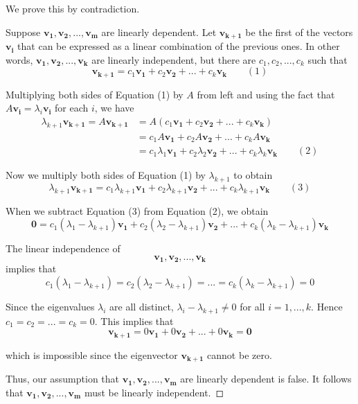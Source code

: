\documentclass[
  a4paper,
  DIV=11,
  numbers=noendperiod,
  oneside]{scrreprt}
\theoremstyle{definition}
\theoremstyle{remark}
\newenvironment{fbx}[3]{\begin{tcolorbox}[enhanced, breakable,%
attach boxed title to top*={xshift=1.4pt},
boxed title style={boxrule=0.0mm, fuzzy shadow={1pt}{-1pt}{0mm}{0.1mm}{gray}, arc=.3em, rounded corners=east, sharp corners=west}, colframe=#1-color2, colbacktitle=#1-color1, colback = white, coltitle=black,  titlerule=0mm, toprule=0pt, bottomrule=.7pt, leftrule=.3em, rightrule=0pt, outer arc=.3em,  arc=0pt,	 sharp corners = east, left=.5em, bottomtitle=1mm, toptitle=1mm,title=\textbf{#2}\hspace{0.5em}{#3}]}
{\end{tcolorbox}}
\begin{document}
\label{Proofux2a-5.5}
\begin{fbx}{Proof}{Proof}{}
\label{Proof*-5.5}
We prove this by contradiction.

Suppose \(\mathbf{v_{1}}, \mathbf{v_{2}}, ..., \mathbf{v_{m}}\) are
linearly dependent. Let \(\mathbf{v_{k+1}}\) be the first of the vectors
\(\mathbf{v_{i}}\) that can be expressed as a linear combination of the
previous ones. In other words,
\(\mathbf{v_{1}}, \mathbf{v_{2}}, ..., \mathbf{v_{k}}\) are linearly
independent, but there are \(c_{1}, c_{2}, ..., c_{k}\) such that
\[\mathbf{v_{k+1}} = c_{1}\mathbf{v_{1}} + c_{2}\mathbf{v_{2}} + ... + c_{k}\mathbf{v_{k}} \qquad (1)\]

Multiplying both sides of Equation (1) by \(A\) from left and using the
fact that \(A\mathbf{v_{i}} = \lambda _{i}\mathbf{v_{i}}\) for each
\(i\), we have \[\begin{alignedat}{2}
        \lambda _{k+1}\mathbf{v_{k+1}} = A\mathbf{v_{k+1}} &= A(c_{1}\mathbf{v_{1}} + c_{2}\mathbf{v_{2}} + ... + c_{k}\mathbf{v_{k}}) \\
        {} &= c_{1}A\mathbf{v_{1}} + c_{2}A\mathbf{v_{2}} + ... + c_{k}A\mathbf{v_{k}} \\
        {} &= c_{1}\lambda _{1}\mathbf{v_{1}} + c_{2}\lambda _{2}\mathbf{v_{2}} + ... + c_{k}\lambda _{k}\mathbf{v_{k}} \qquad (2) 
    \end{alignedat}\]

Now we multiply both sides of Equation (1) by \(\lambda _{k+1}\) to
obtain
\[\lambda _{k+1}\mathbf{v_{k+1}} = c_{1}\lambda _{k+1}\mathbf{v_{1}} + c_{2}\lambda _{k+1}\mathbf{v_{2}} + ... + c_{k}\lambda _{k+1}\mathbf{v_{k}} \qquad (3)\]

When we subtract Equation (3) from Equation (2), we obtain
\[\mathbf{0} = c_{1}(\lambda _{1}-\lambda _{k+1})\mathbf{v_{1}} + c_{2}(\lambda _{2}-\lambda _{k+1})\mathbf{v_{2}} + ... + c_{k}(\lambda _{k}-\lambda _{k+1})\mathbf{v_{k}}\]

The linear independence of
\[\mathbf{v_{1}}, \mathbf{v_{2}}, ..., \mathbf{v_{k}}\] implies that
\[c_{1}(\lambda _{1}-\lambda _{k+1}) = c_{2}(\lambda _{2}-\lambda _{k+1}) = ... = c_{k}(\lambda _{k}-\lambda _{k+1}) = 0\]

Since the eigenvalues \(\lambda _{i}\) are all distinct,
\(\lambda _{i} - \lambda _{k+1} \neq 0\) for all \(i = 1, ..., k\).
Hence \(c_{1} = c_{2} = ... = c_{k} = 0\). This implies that
\[\mathbf{v_{k+1}} = 0\mathbf{v_{1}} + 0\mathbf{v_{2}} + ... + 0\mathbf{v_{k}} = \mathbf{0}\]

which is impossible since the eigenvector \(\mathbf{v_{k+1}}\) cannot be
zero.

Thus, our assumption that
\(\mathbf{v_{1}}, \mathbf{v_{2}}, ..., \mathbf{v_{m}}\) are linearly
dependent is false. It follows that
\(\mathbf{v_{1}}, \mathbf{v_{2}}, ..., \mathbf{v_{m}}\) must be linearly
independent.~◻

\end{fbx}
\end{document}
